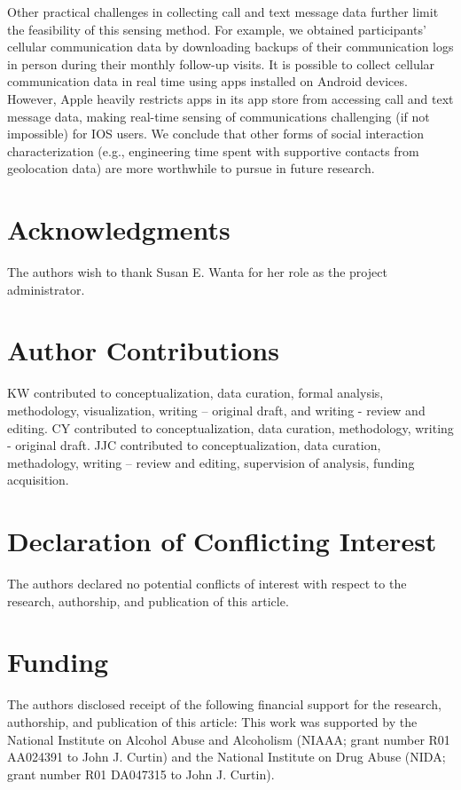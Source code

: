 \documentclass[
  letterpaper,
  DIV=11,
  numbers=noendperiod]{scrartcl}
\begin{document}
Other practical challenges in collecting call and text message data
further limit the feasibility of this sensing method. For example, we
obtained participants' cellular communication data by downloading
backups of their communication logs in person during their monthly
follow-up visits. It is possible to collect cellular communication data
in real time using apps installed on Android devices. However, Apple
heavily restricts apps in its app store from accessing call and text
message data, making real-time sensing of communications challenging (if
not impossible) for IOS users. We conclude that other forms of social
interaction characterization (e.g., engineering time spent with
supportive contacts from geolocation data) are more worthwhile to pursue
in future research.

\section{Acknowledgments}\label{acknowledgments}

The authors wish to thank Susan E. Wanta for her role as the project
administrator.

\section{Author Contributions}\label{author-contributions}

KW contributed to conceptualization, data curation, formal analysis,
methodology, visualization, writing -- original draft, and writing -
review and editing. CY contributed to conceptualization, data curation,
methodology, writing - original draft. JJC contributed to
conceptualization, data curation, methadology, writing -- review and
editing, supervision of analysis, funding acquisition.

\section{Declaration of Conflicting
Interest}\label{declaration-of-conflicting-interest}

The authors declared no potential conflicts of interest with respect to
the research, authorship, and publication of this article.

\section{Funding}\label{funding}

The authors disclosed receipt of the following financial support for the
research, authorship, and publication of this article: This work was
supported by the National Institute on Alcohol Abuse and Alcoholism
(NIAAA; grant number R01 AA024391 to John J. Curtin) and the National
Institute on Drug Abuse (NIDA; grant number R01 DA047315 to John J.
Curtin).
\end{document}
